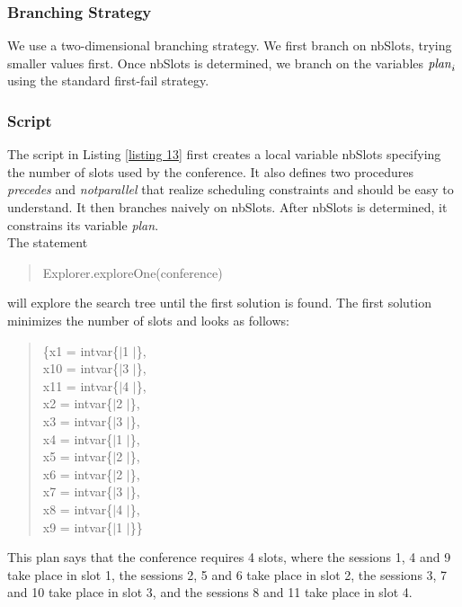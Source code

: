 \documentclass[a4paper]{scrartcl}
\begin{document}
\subsubsection{Branching Strategy}
We use a two-dimensional branching strategy. 
We first branch on nbSlots, trying smaller values first. 
Once nbSlots is determined, we branch on the variables ${\it plan}_i $  
using the standard first-fail strategy. 

\subsubsection{Script}
The script in Listing \ref{listing 13} first creates a local
variable nbSlots specifying the number of slots used by the 
conference. It also defines two procedures {\it precedes} and
{\it notparallel} that realize scheduling constraints and
should be easy to understand. It then branches naively on
nbSlots. After nbSlots is determined, it constrains its 
variable {\it plan}.\\
The statement 
\begin{quote}
Explorer.exploreOne(conference)
\end{quote}
will explore the search tree until the first solution is found. 
The first solution minimizes the number of slots and looks as follows: 
\begin{quote}
\{x1 = intvar\{$|$1 $|$\},\\
  x10 = intvar\{$|$3 $|$\}, \\
 x11 = intvar\{$|$4 $|$\}, \\
 x2 = intvar\{$|$2 $|$\}, \\
 x3 = intvar\{$|$3 $|$\},\\ 
 x4 = intvar\{$|$1 $|$\}, \\
 x5 = intvar\{$|$2 $|$\}, \\
 x6 = intvar\{$|$2 $|$\}, \\
 x7 = intvar\{$|$3 $|$\}, \\
 x8 = intvar\{$|$4 $|$\}, \\
 x9 = intvar\{$|$1 $|$\}\}
\end{quote}
This plan says that the conference requires 4 slots, 
where the sessions 1, 4 and 9 take place in slot 1, the sessions 2, 
5 and 6 take place in slot 2, the sessions 3, 7 and 10 take place in 
slot 3, and the sessions 8 and 11 take place in slot 4. 
\end{document}
